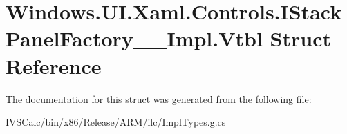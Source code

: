 \hypertarget{struct_windows_1_1_u_i_1_1_xaml_1_1_controls_1_1_i_stack_panel_factory_____impl_1_1_vtbl}{}\section{Windows.\+U\+I.\+Xaml.\+Controls.\+I\+Stack\+Panel\+Factory\+\_\+\+\_\+\+Impl.\+Vtbl Struct Reference}
\label{struct_windows_1_1_u_i_1_1_xaml_1_1_controls_1_1_i_stack_panel_factory_____impl_1_1_vtbl}


The documentation for this struct was generated from the following file\+:\begin{DoxyCompactItemize}
\item 
I\+V\+S\+Calc/bin/x86/\+Release/\+A\+R\+M/ilc/Impl\+Types.\+g.\+cs\end{DoxyCompactItemize}
